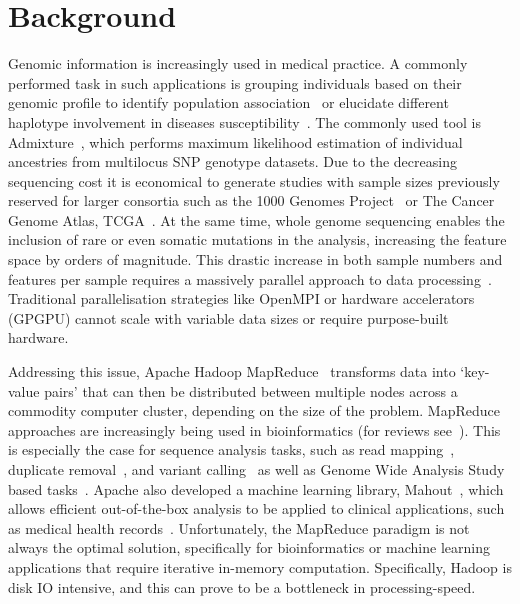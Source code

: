 \documentclass{bmcart}
\begin{document}

\section*{Background}

Genomic information is increasingly used in medical practice.
A commonly performed task in such applications is grouping individuals based on their genomic profile to identify population association~\cite{Gao2007} or elucidate different haplotype involvement in diseases susceptibility~\cite{Laitman2013}.  
The commonly used tool is {\sc Admixture}~\cite{Alexander2009}, which performs maximum likelihood estimation of individual ancestries from multilocus SNP genotype datasets.
Due to the decreasing sequencing cost it is economical to generate studies with sample sizes previously reserved for larger consortia such as the 1000 Genomes Project~\cite{1KG2012} or The Cancer Genome Atlas, TCGA~\cite{TCGA2013}. 
At the same time, whole genome sequencing enables the inclusion of rare or even somatic mutations in the analysis, increasing the feature space by orders of magnitude. This drastic increase in both sample numbers and features per sample requires a massively parallel approach to data processing~\cite{Stein2010}. Traditional parallelisation strategies like OpenMPI or hardware accelerators (GPGPU) cannot scale with variable data sizes or require purpose-built hardware.
 
Addressing this issue, {\sc Apache Hadoop MapReduce}~\cite{Borthakur2007} transforms data into `key-value pairs' that can then be distributed between multiple nodes across a commodity computer cluster, depending on the size of the problem. 
MapReduce approaches are increasingly being used in bioinformatics (for reviews see~\cite{Zou2013, Qiu2010,Taylor2010}). 
This is especially the case for sequence analysis tasks, such as read mapping~\cite{Schatz2009}, duplicate removal~\cite{Jourdren2012}, and variant calling~\cite{Langmead2009, McKenna2010} as well as Genome Wide Analysis Study based tasks~\cite{Huang2013, Guo2014}. 
Apache also developed a machine learning library, Mahout~\cite{Owen2011}, which allows efficient out-of-the-box analysis to be applied to clinical applications, such as medical health records~\cite{Ko2014}.
Unfortunately, the MapReduce paradigm is not always the optimal solution, specifically for bioinformatics or machine learning applications that require iterative in-memory computation. Specifically, Hadoop is disk IO intensive, and this can prove to be a bottleneck in processing-speed.
\end{document}
